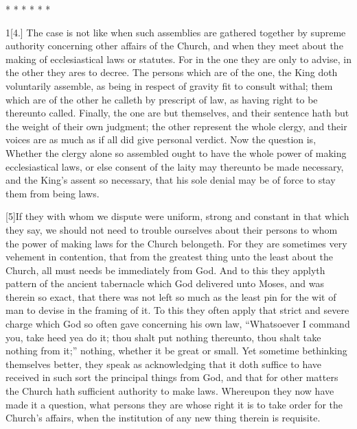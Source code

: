 * * * * * *

1[4.] The case is not like when such assemblies are  gathered together by supreme authority concerning other affairs of the Church, and when they meet about the making of ecclesiastical laws or statutes. For in the one they are only to advise, in the other they ares to decree. The persons which are of the one, the King doth voluntarily assemble, as being in respect of gravity fit to consult withal; them which are of the other he calleth by prescript of law, as having right to be thereunto called. Finally, the one are but themselves, and their sentence hath but the weight of their own judgment; the other represent the whole clergy, and their voices are as much as if all did give personal verdict. Now the question is, Whether the clergy alone so assembled ought to have the whole power of making ecclesiastical laws, or else consent of the laity may thereunto be made necessary, and the King’s assent so necessary, that his sole denial may be of force to stay them from being laws.

[5]If they with whom we dispute were uniform, strong and constant in that which they say, we should not need to trouble ourselves about their persons to whom the power of making laws for the Church belongeth. For they are sometimes very vehement in contention, that from the greatest thing unto the least about the Church, all must needs be immediately from God. And to this they applyth pattern of the ancient tabernacle which God delivered unto Moses, and was therein so exact, that there was not left so much as the least pin for the wit of man to devise in the framing of it.  To this they often apply that strict and severe charge which God so often gave concerning his own law, “Whatsoever I command you, take heed yea do it; thou shalt put nothing thereunto, thou shalt take nothing from it;” nothing, whether it be great or small. Yet sometime bethinking themselves better, they speak as acknowledging that it doth suffice to have received in such sort the principal things from God, and that for other matters the Church hath sufficient authority to make laws. Whereupon they now have made it a question, what persons they are whose right it is to take order for the Church’s affairs, when the institution of any new thing therein is requisite.

